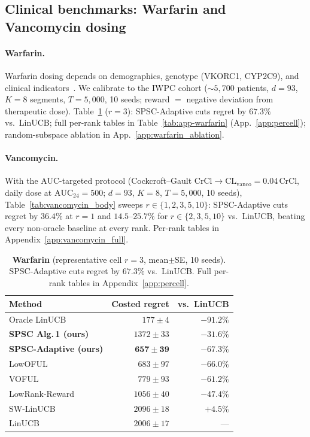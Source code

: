 \documentclass{article}
\begin{document}
\subsection{Clinical benchmarks: Warfarin and Vancomycin dosing}
\label{sec:exp_warfarin}


\paragraph{Warfarin.} Warfarin dosing depends on demographics,
genotype (VKORC1, CYP2C9), and clinical
indicators~\citep{international2009estimation}. We calibrate to the
IWPC cohort (${\sim}5{,}700$ patients, $d{=}93$, $K{=}8$ segments,
$T{=}5{,}000$, 10 seeds; reward $=$ negative deviation from
therapeutic dose). Table~\ref{tab:warfarin_body} ($r{=}3$):
SPSC-Adaptive cuts regret by $67.3\%$ vs.\ LinUCB; full per-rank
tables in Table~\ref{tab:app-warfarin} (App.~\ref{app:percell});
random-subspace ablation in App.~\ref{app:warfarin_ablation}.

\paragraph{Vancomycin.} With the AUC-targeted
\citet{rybak2020therapeutic} protocol (Cockcroft--Gault
$\mathrm{CrCl}\to\mathrm{CL}_{\mathrm{vanco}}=0.04\,\mathrm{CrCl}$,
daily dose at $\mathrm{AUC}_{24}{=}500$; $d{=}93$, $K{=}8$,
$T{=}5{,}000$, 10 seeds), Table~\ref{tab:vancomycin_body} sweeps
$r\in\{1,2,3,5,10\}$: SPSC-Adaptive cuts regret by $36.4\%$ at $r{=}1$
and $14.5$--$25.7\%$ for $r\in\{2,3,5,10\}$ vs.\ LinUCB, beating every
non-oracle baseline at every rank. Per-rank tables in
Appendix~\ref{app:vancomycin_full}.

\begin{table}[t]
\centering
\caption{\textbf{Warfarin} (representative cell $r{=}3$, mean$\pm$SE,
10 seeds). SPSC-Adaptive cuts regret by $67.3\%$ vs.\ LinUCB. Full
per-rank tables in Appendix~\ref{app:percell}.}
\label{tab:warfarin_body}
\small
\begin{tabular}{lrr}
\toprule
Method & Costed regret & vs.\ LinUCB \\
\midrule
Oracle LinUCB                  & $177\pm 4$   & $-91.2\%$\\
\textbf{SPSC Alg.\,1 (ours)}   & $1372\pm 33$ & $-31.6\%$\\
\textbf{SPSC-Adaptive (ours)}  & $\mathbf{657\pm 39}$ & $\mathbf{-67.3\%}$\\
LowOFUL                        & $683\pm 97$  & $-66.0\%$\\
VOFUL                          & $779\pm 93$  & $-61.2\%$\\
LowRank-Reward                 & $1056\pm 40$ & $-47.4\%$\\
SW-LinUCB                      & $2096\pm 18$ & $+4.5\%$\\
LinUCB                         & $2006\pm 17$ & ---\\
\bottomrule
\end{tabular}
\end{table}
\end{document}
